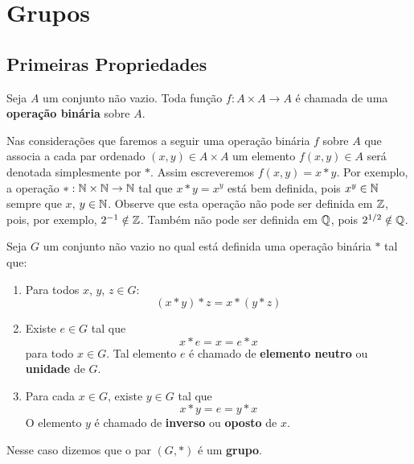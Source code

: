 \chapter{Grupos}

\section{Primeiras Propriedades} %
\label{sec:primeiras_propriedades}

\begin{definicao}
   Seja $A$ um conjunto não vazio. Toda função $f : A \times A \to A$ é chamada de uma \textbf{operação binária} sobre $A$.
\end{definicao}

Nas considerações que faremos a seguir uma operação binária $f$ sobre $A$ que associa a cada par ordenado $(x, y) \in A \times A$ um elemento $f(x, y) \in A$ será denotada simplesmente por $*$. Assim escreveremos $f(x, y) = x*y$. Por exemplo, a operação $* : \mathbb{N} \times \mathbb{N} \to \mathbb{N}$ tal que $x*y = x^y$ está bem definida, pois $x^y \in \mathbb{N}$ sempre que $x$, $y \in \mathbb{N}$. Observe que esta operação não pode ser definida em $\mathbb{Z}$, pois, por exemplo, $2^{-1} \notin \mathbb{Z}$. Também não pode ser definida em $\mathbb{Q}$, pois $2^{1/2} \notin \mathbb{Q}$.

\begin{definicao}
    Seja $G$ um conjunto não vazio no qual está definida uma operação binária $*$ tal que:
    \begin{enumerate}[label={\roman*})]
        \item Para todos $x$, $y$, $z\in G$:
        \[
            (x*y)*z=x*(y*z)
        \]

        \item Existe $e \in G$ tal que
        \[
            x*e = x = e*x
        \]
        para todo $x \in G$. Tal elemento $e$ é chamado de \textbf{elemento neutro} ou \textbf{unidade} de $G$.

        \item Para cada $x \in G$, existe $y \in G$ tal que
        \[
            x*y = e = y*x
        \]
        O elemento $y$ é chamado de \textbf{inverso} ou \textbf{oposto} de $x$.
    \end{enumerate}
    Nesse caso dizemos que o par $(G, *)$ é um \textbf{grupo}.
\end{definicao}

